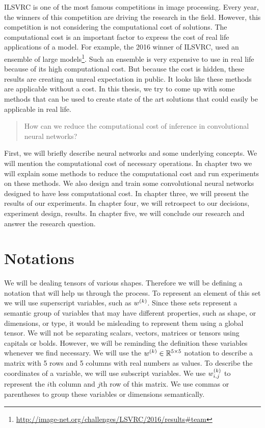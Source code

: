 ILSVRC is one of the most famous competitions in image processing. Every year, the winners of this competition are driving the research in the field. However, this competition is not considering the computational cost of solutions. The computational cost is an important factor to express the cost of real life applications of a model. For example, the 2016 winner of ILSVRC, used an ensemble of large models\footnote{\url{http://image-net.org/challenges/LSVRC/2016/results\#team}}. Such an ensemble is very expensive to use in real life because of its high computational cost. But because the cost is hidden, these results are creating an unreal expectation in public. It looks like these methods are applicable without a cost. In this thesis, we try to come up with some methods that can be used to create state of the art solutions that could easily be applicable in real life. %

\begin{quote}
How can we reduce the computational cost of inference in convolutional neural networks?
\end{quote}

First, we will briefly describe neural networks and some underlying concepts. We will mention the computational cost of necessary operations. In chapter two we will explain some methods to reduce the computational cost and run experiments on these methods. We also design and train some convolutional neural networks designed to have less computational cost. In chapter three, we will present the results of our experiments. In chapter four, we will retrospect to our decisions, experiment design, results. In chapter five, we will conclude our research and answer the research question.


\section{Notations}
We will be dealing tensors of various shapes. Therefore we will be defining a notation that will help us through the process. To represent an element of this set we will use superscript variables, such as $w^{(k)}$. Since these sets represent a semantic group of variables that may have different properties, such as shape, or dimensions, or type, it would be misleading to represent them using a global tensor. We will not be separating scalars, vectors, matrices or tensors using capitals or bolds. However, we will be reminding the definition these variables whenever we find necessary. We will use the $w^{(k)} \in \mathbb{R}^{5 \times 5}$ notation to describe a matrix with 5 rows and 5 columns with real numbers as values. To describe the coordinates of a variable, we will use subscript variables. We use $w^{(k)}_{i,j}$ to represent the $i$th column and $j$th row of this matrix. We use commas or parentheses to group these variables or dimensions semantically. 
